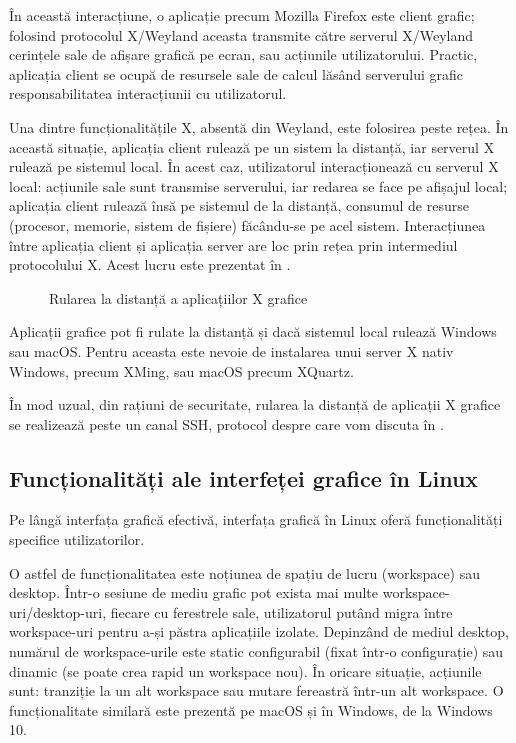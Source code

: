 În această interacțiune, o aplicație precum Mozilla Firefox este client grafic; folosind protocolul X/Weyland aceasta transmite către serverul X/Weyland cerințele sale de afișare grafică pe ecran, sau acțiunile utilizatorului. Practic, aplicația client se ocupă de resursele sale de calcul lăsând serverului grafic responsabilitatea interacțiunii cu utilizatorul.

Una dintre funcționalitățile X, absentă din Weyland, este folosirea peste rețea. În această situație, aplicația client rulează pe un sistem la distanță, iar serverul X rulează pe sistemul local. În acest caz, utilizatorul interacționează cu serverul X local: acțiunile sale sunt transmise serverului, iar redarea se face pe afișajul local; aplicația client rulează însă pe sistemul de la distanță, consumul de resurse (procesor, memorie, sistem de fișiere) făcându-se pe acel sistem. Interacțiunea între aplicația client și aplicația server are loc prin rețea prin intermediul protocolului X. Acest lucru este prezentat în .

\begin{figure}[htbp]
  \centering
  \def\svgwidth{\columnwidth}
  
  \caption{Rularea la distanță a aplicațiilor X grafice}
  \label{fig:ui:remote-x}
\end{figure}

Aplicații grafice pot fi rulate la distanță și dacă sistemul local rulează Windows sau macOS. Pentru aceasta este nevoie de instalarea unui server X nativ Windows, precum XMing, sau macOS precum XQuartz.

În mod uzual, din rațiuni de securitate, rularea la distanță de aplicații X grafice se realizează peste un canal SSH, protocol despre care vom discuta în .

\subsection{Funcționalități ale interfeței grafice în Linux}
\label{sec:ui:linux-gui-features}

Pe lângă interfața grafică efectivă, interfața grafică în Linux oferă funcționalități specifice utilizatorilor.

O astfel de funcționalitatea este noțiunea de spațiu de lucru (workspace) sau desktop. Într-o sesiune de mediu grafic pot exista mai multe workspace-uri/desktop-uri, fiecare cu ferestrele sale, utilizatorul putând migra între workspace-uri pentru a-și păstra aplicațiile izolate. Depinzând de mediul desktop, numărul de workspace-urile este static configurabil (fixat într-o configurație) sau dinamic (se poate crea rapid un workspace nou). În oricare situație, acțiunile sunt: tranziție la un alt workspace sau mutare fereastră într-un alt workspace. O funcționalitate similară este prezentă pe macOS și în Windows, de la Windows 10.

